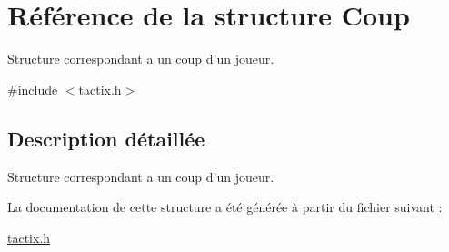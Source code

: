 \hypertarget{struct_coup}{\section{Référence de la structure Coup}
\label{struct_coup}
}


Structure correspondant a un coup d'un joueur.  




{\ttfamily \#include $<$tactix.\-h$>$}



\subsection{Description détaillée}
Structure correspondant a un coup d'un joueur. 

La documentation de cette structure a été générée à partir du fichier suivant \-:\begin{DoxyCompactItemize}
\item 
\hyperlink{tactix_8h}{tactix.\-h}\end{DoxyCompactItemize}
